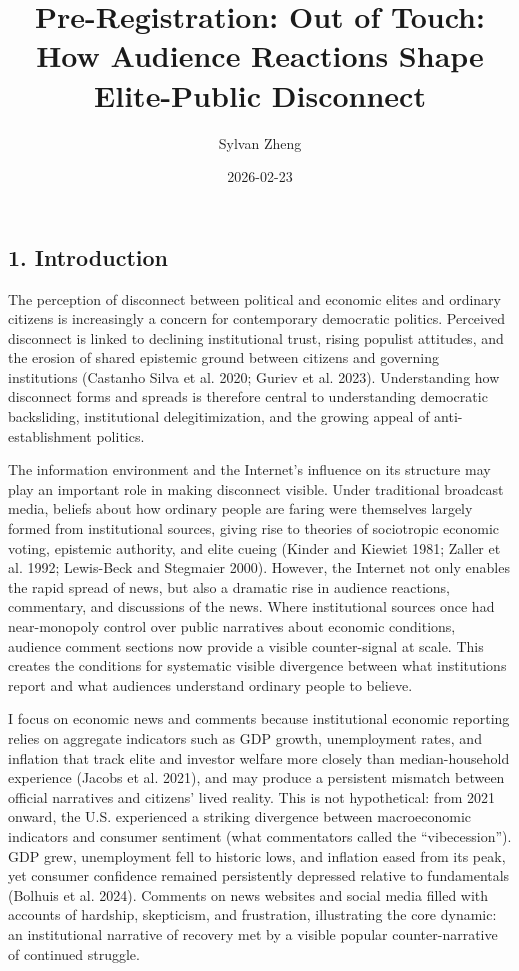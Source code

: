 \documentclass[
  12pt]{article}
\title{Pre-Registration: Out of Touch: How Audience Reactions Shape
Elite-Public Disconnect}
\author{Sylvan Zheng}
\date{2026-02-23}
\begin{document}
\maketitle

\subsection{1. Introduction}\label{introduction}

The perception of disconnect between political and economic elites and
ordinary citizens is increasingly a concern for contemporary democratic
politics. Perceived disconnect is linked to declining institutional
trust, rising populist attitudes, and the erosion of shared epistemic
ground between citizens and governing institutions (Castanho Silva et
al. 2020; Guriev et al. 2023). Understanding how disconnect forms and
spreads is therefore central to understanding democratic backsliding,
institutional delegitimization, and the growing appeal of
anti-establishment politics.

The information environment and the Internet's influence on its
structure may play an important role in making disconnect visible. Under
traditional broadcast media, beliefs about how ordinary people are
faring were themselves largely formed from institutional sources, giving
rise to theories of sociotropic economic voting, epistemic authority,
and elite cueing (Kinder and Kiewiet 1981; {Zaller et al.} 1992;
Lewis-Beck and Stegmaier 2000). However, the Internet not only enables
the rapid spread of news, but also a dramatic rise in audience
reactions, commentary, and discussions of the news. Where institutional
sources once had near-monopoly control over public narratives about
economic conditions, audience comment sections now provide a visible
counter-signal at scale. This creates the conditions for systematic
visible divergence between what institutions report and what audiences
understand ordinary people to believe.

I focus on economic news and comments because institutional economic
reporting relies on aggregate indicators such as GDP growth,
unemployment rates, and inflation that track elite and investor welfare
more closely than median-household experience (Jacobs et al. 2021), and
may produce a persistent mismatch between official narratives and
citizens' lived reality. This is not hypothetical: from 2021 onward, the
U.S. experienced a striking divergence between macroeconomic indicators
and consumer sentiment (what commentators called the ``vibecession'').
GDP grew, unemployment fell to historic lows, and inflation eased from
its peak, yet consumer confidence remained persistently depressed
relative to fundamentals (Bolhuis et al. 2024). Comments on news
websites and social media filled with accounts of hardship, skepticism,
and frustration, illustrating the core dynamic: an institutional
narrative of recovery met by a visible popular counter-narrative of
continued struggle.
\end{document}
